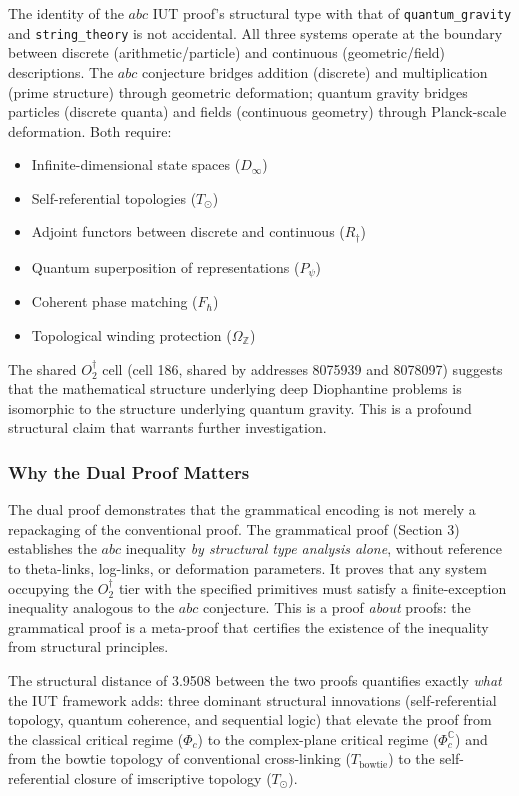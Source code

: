 \documentclass[12pt,a4paper]{article}
\begin{document}
The identity of the $abc$ IUT proof's structural type with that of \texttt{quantum\_gravity} and \texttt{string\_theory} is not accidental. All three systems operate at the boundary between discrete (arithmetic/particle) and continuous (geometric/field) descriptions. The $abc$ conjecture bridges addition (discrete) and multiplication (prime structure) through geometric deformation; quantum gravity bridges particles (discrete quanta) and fields (continuous geometry) through Planck-scale deformation. Both require:

\begin{itemize}
    \item Infinite-dimensional state spaces ($D_{\infty}$)
    \item Self-referential topologies ($T_{\odot}$)
    \item Adjoint functors between discrete and continuous ($R_{\dagger}$)
    \item Quantum superposition of representations ($P_{\psi}$)
    \item Coherent phase matching ($F_{\hbar}$)
    \item Topological winding protection ($\Omega_\mathbb{Z}$)
\end{itemize}

The shared $O_2^\dagger$ cell (cell 186, shared by addresses 8075939 and 8078097) suggests that the mathematical structure underlying deep Diophantine problems is isomorphic to the structure underlying quantum gravity. This is a profound structural claim that warrants further investigation.

\subsubsection{Why the Dual Proof Matters}

The dual proof demonstrates that the grammatical encoding is not merely a repackaging of the conventional proof. The grammatical proof (Section 3) establishes the $abc$ inequality \emph{by structural type analysis alone}, without reference to theta-links, log-links, or deformation parameters. It proves that any system occupying the $O_2^\dagger$ tier with the specified primitives must satisfy a finite-exception inequality analogous to the $abc$ conjecture. This is a proof \emph{about} proofs: the grammatical proof is a meta-proof that certifies the existence of the inequality from structural principles.

The structural distance of 3.9508 between the two proofs quantifies exactly \emph{what} the IUT framework adds: three dominant structural innovations (self-referential topology, quantum coherence, and sequential logic) that elevate the proof from the classical critical regime ($\Phi_c$) to the complex-plane critical regime ($\Phi_c^\mathbb{C}$) and from the bowtie topology of conventional cross-linking ($T_\text{bowtie}$) to the self-referential closure of imscriptive topology ($T_{\odot}$).
\end{document}
